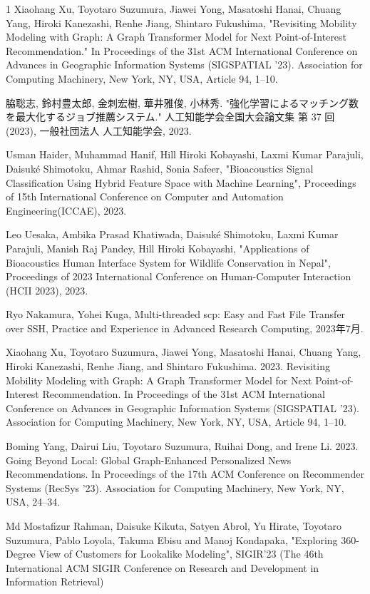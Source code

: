 \begin{査読付}{1}
Xiaohang Xu, Toyotaro Suzumura, Jiawei Yong, Masatoshi Hanai, Chuang Yang, Hiroki Kanezashi, Renhe Jiang, Shintaro Fukushima, 
"Revisiting Mobility Modeling with Graph: A Graph Transformer Model for Next Point-of-Interest Recommendation."
In Proceedings of the 31st ACM International Conference on Advances in Geographic Information Systems (SIGSPATIAL ’23). Association for Computing Machinery, New York, NY, USA, Article
94, 1–10.

脇聡志, 鈴村豊太郎, 金刺宏樹, 華井雅俊, 小林秀. "強化学習によるマッチング数を最大化するジョブ推薦システム." 人工知能学会全国大会論文集 第 37 回 (2023), 一般社団法人 人工知能学会, 2023.

 Usman Haider, Muhammad Hanif, Hill Hiroki Kobayashi, Laxmi Kumar Parajuli, Daisuké Shimotoku, Ahmar Rashid, Sonia Safeer, "Bioacoustics Signal Classification Using Hybrid Feature Space with Machine Learning", Proceedings of 15th International Conference on Computer and Automation Engineering(ICCAE), 2023.  

 Leo Uesaka, Ambika Prasad Khatiwada, Daisuk\'e Shimotoku, Laxmi Kumar Parajuli, Manish Raj Pandey, Hill Hiroki Kobayashi, "Applications of Bioacoustics Human Interface System for Wildlife Conservation in Nepal", Proceedings of 2023 International Conference on Human-Computer Interaction (HCII 2023), 2023.  

Ryo Nakamura, Yohei Kuga, Multi-threaded scp: Easy and Fast File Transfer over SSH, Practice and Experience in Advanced Research Computing, 2023年7月.


Xiaohang Xu, Toyotaro Suzumura, Jiawei Yong, Masatoshi Hanai, Chuang Yang, Hiroki Kanezashi, Renhe Jiang, and Shintaro Fukushima. 2023. Revisiting Mobility Modeling with Graph: A Graph Transformer Model for Next Point-of-Interest Recommendation. In Proceedings of the 31st ACM International Conference on Advances in Geographic Information Systems (SIGSPATIAL '23). Association for Computing Machinery, New York, NY, USA, Article 94, 1–10.

Boming Yang, Dairui Liu, Toyotaro Suzumura, Ruihai Dong, and Irene Li. 2023. Going Beyond Local: Global Graph-Enhanced Personalized News Recommendations. In Proceedings of the 17th ACM Conference on Recommender Systems (RecSys '23). Association for Computing Machinery, New York, NY, USA, 24–34.

Md Mostafizur Rahman, Daisuke Kikuta, Satyen Abrol, Yu Hirate, Toyotaro Suzumura, Pablo Loyola, Takuma Ebisu and Manoj Kondapaka, "Exploring 360-Degree View of Customers for Lookalike Modeling",  SIGIR'23 (The 46th International ACM
SIGIR Conference on Research and Development in Information
Retrieval) 


\end{査読付}

